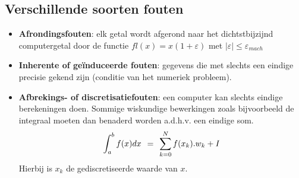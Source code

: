 \documentclass[11pt]{report}
\def \eq {\hspace{1.5mm}=\hspace{1.5mm}}
\begin{document}
	\subsection{Verschillende soorten fouten}
		\begin{itemize}
			\item \textbf{Afrondingsfouten}: elk getal wordt afgerond naar het dichtstbijzijnd computergetal door de functie $fl(x) = x(1 + \varepsilon)$ met $|\varepsilon| \leqslant \varepsilon_{mach}$
			\item \textbf{Inherente of ge\"{i}nduceerde fouten}: gegevens die met slechts een eindige precisie gekend zijn (conditie van het numeriek probleem).
			\item \textbf{Afbrekings- of discretisatiefouten}: een computer kan slechts eindige berekeningen doen. Sommige wiskundige bewerkingen zoals  bijvoorbeeld de integraal moeten dan benaderd worden a.d.h.v. een eindige som.
			$$\int_a^b f(x)dx \eq \sum ^N_{k=0} f(x_k) . w_k + I$$
			Hierbij is $x_k$ de gediscretiseerde waarde van $x$.
		\end{itemize}
\end{document}
